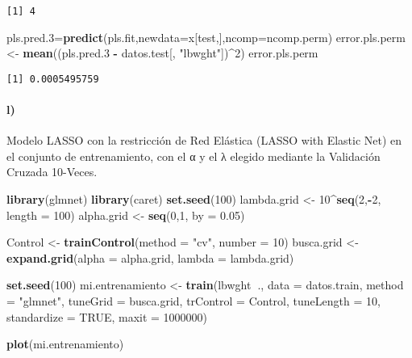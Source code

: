 \documentclass[]{article}
\newenvironment{Shaded}{\begin{snugshade}}{\end{snugshade}}
\newcommand{\KeywordTok}[1]{\textcolor[rgb]{0.13,0.29,0.53}{\textbf{#1}}}
\newcommand{\DataTypeTok}[1]{\textcolor[rgb]{0.13,0.29,0.53}{#1}}
\newcommand{\DecValTok}[1]{\textcolor[rgb]{0.00,0.00,0.81}{#1}}
\newcommand{\FloatTok}[1]{\textcolor[rgb]{0.00,0.00,0.81}{#1}}
\newcommand{\StringTok}[1]{\textcolor[rgb]{0.31,0.60,0.02}{#1}}
\newcommand{\OtherTok}[1]{\textcolor[rgb]{0.56,0.35,0.01}{#1}}
\newcommand{\OperatorTok}[1]{\textcolor[rgb]{0.81,0.36,0.00}{\textbf{#1}}}
\newcommand{\NormalTok}[1]{#1}
\let\oldparagraph\paragraph
\renewcommand{\paragraph}[1]{\oldparagraph{#1}\mbox{}}
\begin{document}
\begin{verbatim}
[1] 4
\end{verbatim}

\begin{Shaded}
\begin{Highlighting}[]
\NormalTok{pls.pred.}\DecValTok{3}\NormalTok{=}\KeywordTok{predict}\NormalTok{(pls.fit,}\DataTypeTok{newdata=}\NormalTok{x[test,],}\DataTypeTok{ncomp=}\NormalTok{ncomp.perm)}
\NormalTok{error.pls.perm <-}\StringTok{ }\KeywordTok{mean}\NormalTok{((pls.pred.}\DecValTok{3} \OperatorTok{-}\StringTok{ }\NormalTok{datos.test[, }\StringTok{"lbwght"}\NormalTok{])}\OperatorTok{^}\DecValTok{2}\NormalTok{)}
\NormalTok{error.pls.perm}
\end{Highlighting}
\end{Shaded}

\begin{verbatim}
[1] 0.0005495759
\end{verbatim}

\paragraph{l)}\label{l}

Modelo LASSO con la restricción de Red Elástica (LASSO with Elastic Net)
en el conjunto de entrenamiento, con el α y el λ elegido mediante la
Validación Cruzada 10-Veces.

\begin{Shaded}
\begin{Highlighting}[]
\KeywordTok{library}\NormalTok{(glmnet)}
\KeywordTok{library}\NormalTok{(caret)}
\KeywordTok{set.seed}\NormalTok{(}\DecValTok{100}\NormalTok{)}
\NormalTok{lambda.grid <-}\StringTok{ }\DecValTok{10}\OperatorTok{^}\KeywordTok{seq}\NormalTok{(}\DecValTok{2}\NormalTok{,}\OperatorTok{-}\DecValTok{2}\NormalTok{, }\DataTypeTok{length =} \DecValTok{100}\NormalTok{)}
\NormalTok{alpha.grid <-}\StringTok{ }\KeywordTok{seq}\NormalTok{(}\DecValTok{0}\NormalTok{,}\DecValTok{1}\NormalTok{, }\DataTypeTok{by =} \FloatTok{0.05}\NormalTok{)}

\NormalTok{Control <-}\StringTok{ }\KeywordTok{trainControl}\NormalTok{(}\DataTypeTok{method =} \StringTok{"cv"}\NormalTok{, }\DataTypeTok{number =} \DecValTok{10}\NormalTok{)}
\NormalTok{busca.grid <-}\StringTok{ }\KeywordTok{expand.grid}\NormalTok{(}\DataTypeTok{alpha =}\NormalTok{ alpha.grid, }\DataTypeTok{lambda =}\NormalTok{ lambda.grid)}

\KeywordTok{set.seed}\NormalTok{(}\DecValTok{100}\NormalTok{)}
\NormalTok{mi.entrenamiento <-}\StringTok{ }\KeywordTok{train}\NormalTok{(lbwght}\OperatorTok{~}\NormalTok{., }\DataTypeTok{data =}\NormalTok{ datos.train, }\DataTypeTok{method =} \StringTok{"glmnet"}\NormalTok{, }
                          \DataTypeTok{tuneGrid =}\NormalTok{ busca.grid, }\DataTypeTok{trControl =}\NormalTok{ Control,}
                          \DataTypeTok{tuneLength =} \DecValTok{10}\NormalTok{,}
                          \DataTypeTok{standardize =} \OtherTok{TRUE}\NormalTok{, }\DataTypeTok{maxit =} \DecValTok{1000000}\NormalTok{)}

\KeywordTok{plot}\NormalTok{(mi.entrenamiento)}
\end{Highlighting}
\end{Shaded}
\end{document}
